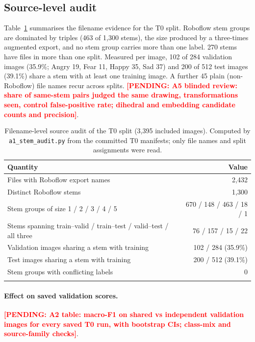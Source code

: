 \documentclass[pdflatex,sn-mathphys-num]{sn-jnl}
\newcommand{\pending}[1]{\textcolor{red}{\textbf{[PENDING: #1]}}}
\begin{document}
\subsection{Source-level audit}\label{sec:res-audit}
Table~\ref{tab:audit} summarises the filename evidence for the T0 split. Roboflow stem groups are dominated by triples (463 of 1,300 stems), the size produced by a three-times augmented export, and no stem group carries more than one label. 270 stems have files in more than one split. Measured per image, 102 of 284 validation images (35.9\%; Angry 19, Fear 11, Happy 35, Sad 37) and 200 of 512 test images (39.1\%) share a stem with at least one training image. A further 45 plain (non-Roboflow) file names recur across splits. \pending{A5 blinded review: share of same-stem pairs judged the same drawing, transformations seen, control false-positive rate; dihedral and embedding candidate counts and precision}.

\begin{table}[t]
\caption{Filename-level source audit of the T0 split (3,395 included images). Computed by \texttt{a1\_stem\_audit.py} from the committed T0 manifests; only file names and split assignments were read.}\label{tab:audit}
\begin{tabular}{@{}lr@{}}
\toprule
Quantity & Value \\
\midrule
Files with Roboflow export names & 2,432 \\
Distinct Roboflow stems & 1,300 \\
Stem groups of size 1 / 2 / 3 / 4 / 5 & 670 / 148 / 463 / 18 / 1 \\
Stems spanning train--valid / train--test / valid--test / all three & 76 / 157 / 15 / 22 \\
Validation images sharing a stem with training & 102 / 284 (35.9\%) \\
Test images sharing a stem with training & 200 / 512 (39.1\%) \\
Stem groups with conflicting labels & 0 \\
\botrule
\end{tabular}
\end{table}

\paragraph{Effect on saved validation scores.} \pending{A2 table: macro-F1 on shared vs independent validation images for every saved T0 run, with bootstrap CIs; class-mix and source-family checks}.
\end{document}
